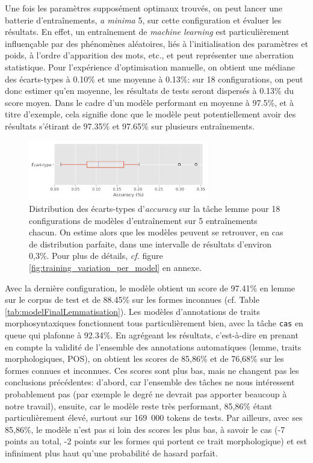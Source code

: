 Une fois les paramètres supposément optimaux trouvés, on peut lancer une batterie d'entraînements, \textit{a minima} 5, sur cette configuration et évaluer les résultats. En effet, un entraînement de \textit{machine learning }est particulièrement influençable par des phénomènes aléatoires, liés à l'initialisation des paramètres et poids, à l'ordre d'apparition des mots, etc., et peut représenter une aberration statistique. Pour l'expérience d'optimisation manuelle, on obtient une médiane des écarts-types à 0.10\% et une moyenne à 0.13\%: sur 18 configurations, on peut donc estimer qu'en moyenne, les résultats de tests seront dispersés à 0.13\% du score moyen. Dans le cadre d'un modèle performant en moyenne à 97.5\%, et à titre d'exemple, cela signifie donc que le modèle peut potentiellement avoir des résultats s'étirant de 97.35\% et 97.65\% sur plusieurs entraînements.

\begin{figure}[ht]
    \centering
    \includegraphics[width=0.7\textwidth]{results/lemmatisation/entrainement/Variance.png}
    \caption{Distribution des écarts-types d'\textit{accuracy} sur la tâche lemme pour 18 configurations de modèles d'entraînement sur 5 entraînements chacun. On estime alors que les modèles peuvent se retrouver, en cas de distribution parfaite, dans une intervalle de résultats d'environ 0,3\%. Pour plus de détails, \textit{cf.} figure \ref{fig:training_variation_per_model} en annexe.}
    \label{fig:training_variation}
\end{figure}

Avec la dernière configuration, le modèle obtient un score de 97.41\% en lemme sur le corpus de test et de 88.45\% sur les formes inconnues (cf. Table \ref{tab:modelFinalLemmatisation}). Les modèles d'annotations de traits morphosyntaxiques fonctionnent tous particulièrement bien, avec la tâche \texttt{cas} en queue qui plafonne à 92.34\%. En agrégeant les résultats, c'est-à-dire en prenant en compte la validité de l'ensemble des annotations automatiques (lemme, traits morphologiques, POS), on obtient les scores de 85,86\% et de 76,68\% sur les formes connues et inconnues. Ces scores sont plus bas, mais ne changent pas les conclusions précédentes: d'abord, car l'ensemble des tâches ne nous intéressent probablement pas (par exemple le degré ne devrait pas apporter beaucoup à notre travail), ensuite, car le modèle reste très performant, 85,86\% étant particulièrement élevé, surtout sur 169~000 tokens de tests. Par ailleurs, avec ses 85,86\%, le modèle n'est pas si loin des scores les plus bas, à savoir le cas (-7 points au total, -2 points sur les formes qui portent ce trait morphologique) et est infiniment plus haut qu'une probabilité de hasard parfait.


